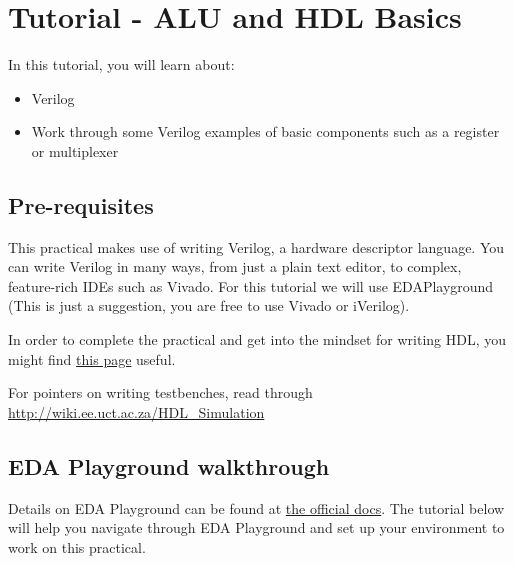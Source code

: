\section{Tutorial - ALU and HDL Basics}
In this tutorial, you will learn about:
\begin{itemize}
    \item Verilog
    \item Work through some Verilog examples of basic components such as a register or multiplexer
\end{itemize}

\subsection{Pre-requisites}
This practical makes use of writing Verilog, a hardware descriptor language. You can write Verilog in many ways, from just a plain text editor, to complex, feature-rich IDEs such as Vivado. For this tutorial we will use EDAPlayground (This is just a suggestion, you are free to use Vivado or iVerilog).

In order to complete the practical and get into the mindset for writing HDL, you might find \href{http://wiki.ee.uct.ac.za/HDL_-_FAQs}{this page} useful.

For pointers on writing testbenches, read through \href{http://wiki.ee.uct.ac.za/HDL_Simulation}{http://wiki.ee.uct.ac.za/HDL\_Simulation}

\subsection{EDA Playground walkthrough}
Details on EDA Playground can be found at \href{https://eda-playground.readthedocs.io/en/latest/}{the official docs}.
The tutorial below will help you navigate through EDA Playground and set up your environment to work on this practical.

